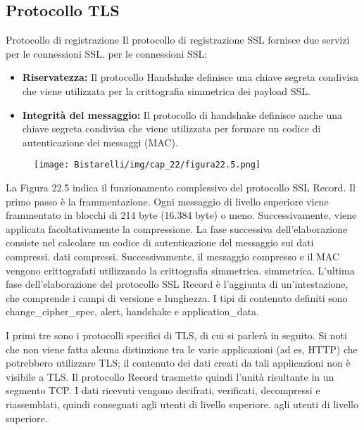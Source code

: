 \subsection{Protocollo TLS}
Protocollo di registrazione Il protocollo di registrazione SSL fornisce due servizi per le connessioni SSL.
per le connessioni SSL:

\begin{itemize}
    \item  \textbf{Riservatezza:} Il protocollo Handshake definisce una chiave segreta condivisa che viene utilizzata per la crittografia simmetrica dei payload SSL.
    
    \item \textbf{Integrità del messaggio:} Il protocollo di handshake definisce anche una chiave segreta condivisa che viene utilizzata per formare un codice di autenticazione dei messaggi (MAC).
\end{itemize}

\begin{figure}[H]
	\centering
    \texttt{[image: Bistarelli/img/cap\_22/figura22.5.png]}
\end{figure}

La Figura 22.5 indica il funzionamento complessivo del protocollo SSL Record. Il primo passo è la frammentazione.
Ogni messaggio di livello superiore viene frammentato in blocchi di 214 byte (16.384 byte) o meno. Successivamente, viene applicata facoltativamente la compressione. La fase successiva dell'elaborazione consiste nel calcolare un codice di autenticazione del messaggio sui dati compressi. dati compressi. Successivamente, il messaggio compresso e il MAC vengono crittografati utilizzando la crittografia simmetrica. simmetrica. L'ultima fase dell'elaborazione del protocollo SSL Record è l'aggiunta di un'intestazione, che comprende i campi di versione e lunghezza. I tipi di contenuto definiti sono change\_cipher\_spec, alert, handshake e application\_data. 

\singlespacing

I primi tre sono i protocolli specifici di TLS, di cui si parlerà in seguito.  Si noti che non viene fatta alcuna distinzione tra le varie applicazioni (ad es, HTTP) che potrebbero utilizzare TLS; il contenuto dei dati creati da tali applicazioni non è visibile a TLS. Il protocollo Record trasmette quindi l'unità risultante in un segmento TCP. I dati ricevuti vengono decifrati, verificati, decompressi e riassemblati, quindi consegnati agli utenti di livello superiore.
agli utenti di livello superiore.

